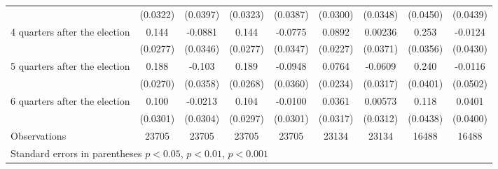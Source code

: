 \begin{table}[!ht]
\begin{tabular}{l*{8}{c}}
                    &    (0.0322)         &    (0.0397)         &    (0.0323)         &    (0.0387)         &    (0.0300)         &    (0.0348)         &    (0.0450)         &    (0.0439)         \\
[0,12em]
 4 quarters after the election&       0.144\sym{***}&     -0.0881\sym{*}  &       0.144\sym{***}&     -0.0775\sym{*}  &      0.0892\sym{***}&     0.00236         &       0.253\sym{***}&     -0.0124         \\
                    &    (0.0277)         &    (0.0346)         &    (0.0277)         &    (0.0347)         &    (0.0227)         &    (0.0371)         &    (0.0356)         &    (0.0430)         \\
[0,12em]
 5 quarters after the election&       0.188\sym{***}&      -0.103\sym{**} &       0.189\sym{***}&     -0.0948\sym{**} &      0.0764\sym{**} &     -0.0609         &       0.240\sym{***}&     -0.0116         \\
                    &    (0.0270)         &    (0.0358)         &    (0.0268)         &    (0.0360)         &    (0.0234)         &    (0.0317)         &    (0.0401)         &    (0.0502)         \\
[0,12em]
 6 quarters after the election&       0.100\sym{***}&     -0.0213         &       0.104\sym{***}&     -0.0100         &      0.0361         &     0.00573         &       0.118\sym{**} &      0.0401         \\
                    &    (0.0301)         &    (0.0304)         &    (0.0297)         &    (0.0301)         &    (0.0317)         &    (0.0312)         &    (0.0438)         &    (0.0400)         \\
\hline
Observations        &       23705         &       23705         &       23705         &       23705         &       23134         &       23134         &       16488         &       16488         \\
\hline\hline
\multicolumn{9}{l}{ Standard errors in parentheses \sym{*} \(p<0.05\), \sym{**} \(p<0.01\), \sym{***} \(p<0.001\)}\\\end{tabular}
\end{table}
